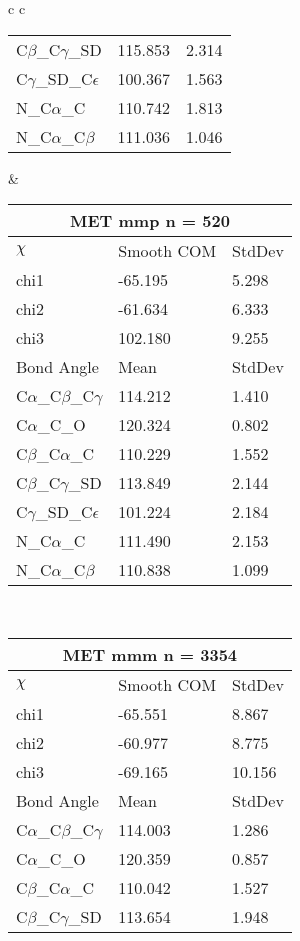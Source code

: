 \begin{longtable}{ c c }
\begin{tabular}{ l l l }
  C$\beta$\_C$\gamma$\_SD & 115.853 & 2.314\\
  C$\gamma$\_SD\_C$\epsilon$ & 100.367 & 1.563\\
  N\_C$\alpha$\_C & 110.742 & 1.813\\
  N\_C$\alpha$\_C$\beta$ & 111.036 & 1.046\\
  \bottomrule
  \end{tabular}
  &
  \begin{tabular}{ l l l }
  \toprule
  \multicolumn{3}{c}{MET \textbf{mmp} n = 520} \\ \toprule
  $\chi$       & Smooth COM & StdDev \\ \midrule
  chi1 & -65.195 & 5.298 \\ 
  chi2 & -61.634 & 6.333 \\ 
  chi3 & 102.180 & 9.255 \\ \midrule
  Bond Angle   & Mean     & StdDev \\ \midrule
  C$\alpha$\_C$\beta$\_C$\gamma$ & 114.212 & 1.410\\
  C$\alpha$\_C\_O & 120.324 & 0.802\\
  C$\beta$\_C$\alpha$\_C & 110.229 & 1.552\\
  C$\beta$\_C$\gamma$\_SD & 113.849 & 2.144\\
  C$\gamma$\_SD\_C$\epsilon$ & 101.224 & 2.184\\
  N\_C$\alpha$\_C & 111.490 & 2.153\\
  N\_C$\alpha$\_C$\beta$ & 110.838 & 1.099\\
  \bottomrule
  \end{tabular}
  \\
  \begin{tabular}{ l l l }
  \toprule
  \multicolumn{3}{c}{MET \textbf{mmm} n = 3354} \\ \toprule
  $\chi$       & Smooth COM & StdDev \\ \midrule
  chi1 & -65.551 & 8.867 \\ 
  chi2 & -60.977 & 8.775 \\ 
  chi3 & -69.165 & 10.156 \\ \midrule
  Bond Angle   & Mean     & StdDev \\ \midrule
  C$\alpha$\_C$\beta$\_C$\gamma$ & 114.003 & 1.286\\
  C$\alpha$\_C\_O & 120.359 & 0.857\\
  C$\beta$\_C$\alpha$\_C & 110.042 & 1.527\\
  C$\beta$\_C$\gamma$\_SD & 113.654 & 1.948\\

\end{tabular}
\end{longtable}

